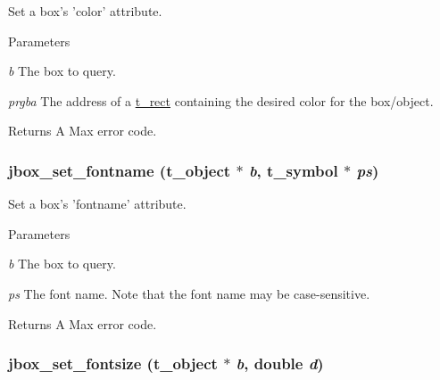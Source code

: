 Set a box's 'color' attribute. 
\begin{DoxyParams}{Parameters}
\item[{\em b}]The box to query. \item[{\em prgba}]The address of a \hyperlink{structt__rect}{t\_\-rect} containing the desired color for the box/object. \end{DoxyParams}
\begin{DoxyReturn}{Returns}
A Max error code. 
\end{DoxyReturn}
\hypertarget{group__jbox_gaa42077bec85957796b46eac319db0ad7}{
\subsubsection[{jbox\_\-set\_\-fontname}]{ jbox\_\-set\_\-fontname ({\bf t\_\-object} $\ast$ {\em b}, \/  {\bf t\_\-symbol} $\ast$ {\em ps})}}
\label{group__jbox_gaa42077bec85957796b46eac319db0ad7}


Set a box's 'fontname' attribute. 
\begin{DoxyParams}{Parameters}
\item[{\em b}]The box to query. \item[{\em ps}]The font name. Note that the font name may be case-\/sensitive. \end{DoxyParams}
\begin{DoxyReturn}{Returns}
A Max error code. 
\end{DoxyReturn}
\hypertarget{group__jbox_gae6342147186d369649574cb04b0b3deb}{
\subsubsection[{jbox\_\-set\_\-fontsize}]{ jbox\_\-set\_\-fontsize ({\bf t\_\-object} $\ast$ {\em b}, \/  double {\em d})}}
\label{group__jbox_gae6342147186d369649574cb04b0b3deb}


